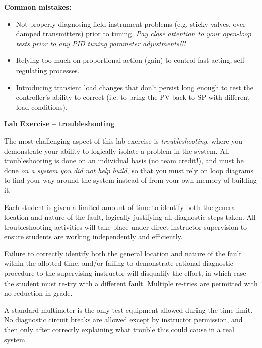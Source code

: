 \documentclass[12pt,a4paper]{article}
\begin{document}
\vfil

{\bf Common mistakes:}

\begin{itemize}
\item{} Not properly diagnosing field instrument problems (e.g. sticky valves, over-damped transmitters) prior to tuning.  {\it Pay close attention to your open-loop tests prior to any PID tuning parameter adjustments!!!}
\item{} Relying too much on proportional action (gain) to control fast-acting, self-regulating processes.
\item{} Introducing transient load changes that don't persist long enough to test the controller's ability to correct (i.e. to bring the PV back to SP with different load conditions).
\end{itemize}











\vfil \eject

\noindent
{\bf Lab Exercise -- troubleshooting}

\vskip 5pt

The most challenging aspect of this lab exercise is {\it troubleshooting}, where you demonstrate your ability to logically isolate a problem in the system.  All troubleshooting is done on an individual basis (no team credit!), and must be done {\it on a system you did not help build}, so that you must rely on loop diagrams to find your way around the system instead of from your own memory of building it.

Each student is given a limited amount of time to identify both the general location and nature of the fault, logically justifying all diagnostic steps taken.  All troubleshooting activities will take place under direct instructor supervision to ensure students are working independently and efficiently. 

Failure to correctly identify both the general location and nature of the fault within the allotted time, and/or failing to demonstrate rational diagnostic procedure to the supervising instructor will disqualify the effort, in which case the student must re-try with a different fault.  Multiple re-tries are permitted with no reduction in grade.

A standard multimeter is the only test equipment allowed during the time limit.  No diagnostic circuit breaks are allowed except by instructor permission, and then only after correctly explaining what trouble this could cause in a real system.  
\end{document}

